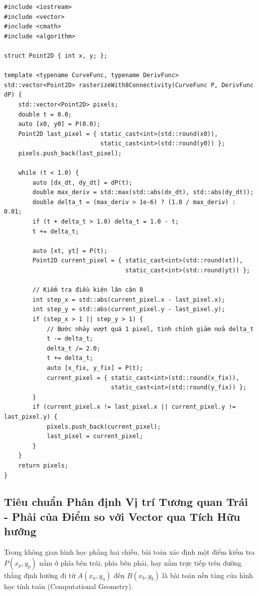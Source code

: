 \begin{verbatim}
#include <iostream>
#include <vector>
#include <cmath>
#include <algorithm>

struct Point2D { int x, y; };

template <typename CurveFunc, typename DerivFunc>
std::vector<Point2D> rasterizeWith8Connectivity(CurveFunc P, DerivFunc dP) {
    std::vector<Point2D> pixels;
    double t = 0.0;
    auto [x0, y0] = P(0.0);
    Point2D last_pixel = { static_cast<int>(std::round(x0)), 
                           static_cast<int>(std::round(y0)) };
    pixels.push_back(last_pixel);

    while (t < 1.0) {
        auto [dx_dt, dy_dt] = dP(t);
        double max_deriv = std::max(std::abs(dx_dt), std::abs(dy_dt));
        double delta_t = (max_deriv > 1e-6) ? (1.0 / max_deriv) : 0.01;
        if (t + delta_t > 1.0) delta_t = 1.0 - t;
        t += delta_t;

        auto [xt, yt] = P(t);
        Point2D current_pixel = { static_cast<int>(std::round(xt)), 
                                  static_cast<int>(std::round(yt)) };
        
        // Kiểm tra điều kiện lân cận 8
        int step_x = std::abs(current_pixel.x - last_pixel.x);
        int step_y = std::abs(current_pixel.y - last_pixel.y);
        if (step_x > 1 || step_y > 1) {
            // Bước nhảy vượt quá 1 pixel, tinh chỉnh giảm nửa delta_t
            t -= delta_t;
            delta_t /= 2.0;
            t += delta_t;
            auto [x_fix, y_fix] = P(t);
            current_pixel = { static_cast<int>(std::round(x_fix)), 
                              static_cast<int>(std::round(y_fix)) };
        }
        if (current_pixel.x != last_pixel.x || current_pixel.y != last_pixel.y) {
            pixels.push_back(current_pixel);
            last_pixel = current_pixel;
        }
    }
    return pixels;
}
\end{verbatim}

\subsection{Tiêu chuẩn Phân định Vị trí Tương quan Trái - Phải của Điểm so với Vector qua Tích Hữu hướng}
\label{subsec:point_left_right_cross_product}

Trong không gian hình học phẳng hai chiều, bài toán xác định một điểm kiểm tra $P(x_p, y_p)$ nằm ở phía bên trái, phía bên phải, hay nằm trực tiếp trên đường thẳng định hướng đi từ $A(x_a, y_a)$ đến $B(x_b, y_b)$ là bài toán nền tảng của hình học tính toán (Computational Geometry).

